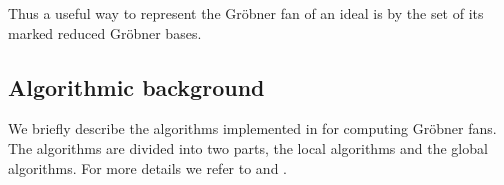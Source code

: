 Thus a useful way to represent the
Gr\"obner fan of an ideal is by the set of its marked reduced Gr\"obner
bases.


\subsection{Algorithmic background}
We briefly describe the algorithms implemented in \name for computing Gr\"obner fans. The algorithms are divided into two parts, the local algorithms and the global algorithms. For more details we refer to \cite{fukuda} and \cite{symmetricfans}.
